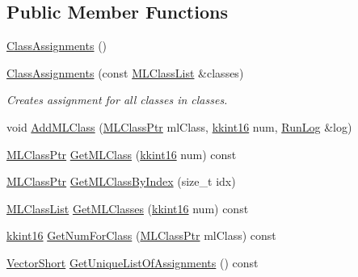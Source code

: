 \subsection*{Public Member Functions}
\begin{DoxyCompactItemize}
\item 
\hyperlink{class_k_k_m_l_l_1_1_class_assignments_a73a506718f34e1b30cc4ce5f4eac7a0e}{Class\+Assignments} ()
\item 
\hyperlink{class_k_k_m_l_l_1_1_class_assignments_a663f8e557f7d2e8f4bb7c79cbb09ac37}{Class\+Assignments} (const \hyperlink{class_k_k_m_l_l_1_1_m_l_class_list}{M\+L\+Class\+List} \&classes)
\begin{DoxyCompactList}\small\item\em Creates assignment for all classes in \textquotesingle{}classes. \end{DoxyCompactList}\item 
void \hyperlink{class_k_k_m_l_l_1_1_class_assignments_acdb4c256d35bd94ee6ddd0fd2f56b939}{Add\+M\+L\+Class} (\hyperlink{namespace_k_k_m_l_l_ac272393853d59e72e8456f14cd6d8c23}{M\+L\+Class\+Ptr} ml\+Class, \hyperlink{namespace_k_k_b_a93809780ee294124dda4c23069f41248}{kkint16} num, \hyperlink{class_k_k_b_1_1_run_log}{Run\+Log} \&log)
\item 
\hyperlink{namespace_k_k_m_l_l_ac272393853d59e72e8456f14cd6d8c23}{M\+L\+Class\+Ptr} \hyperlink{class_k_k_m_l_l_1_1_class_assignments_a1e6deee5eda8bf069953b65f6a0ef187}{Get\+M\+L\+Class} (\hyperlink{namespace_k_k_b_a93809780ee294124dda4c23069f41248}{kkint16} num) const 
\item 
\hyperlink{namespace_k_k_m_l_l_ac272393853d59e72e8456f14cd6d8c23}{M\+L\+Class\+Ptr} \hyperlink{class_k_k_m_l_l_1_1_class_assignments_a241c008a2778230aeb29713eebd6465c}{Get\+M\+L\+Class\+By\+Index} (size\+\_\+t idx)
\item 
\hyperlink{class_k_k_m_l_l_1_1_m_l_class_list}{M\+L\+Class\+List} \hyperlink{class_k_k_m_l_l_1_1_class_assignments_ab22230c4e9de89d4c28123629dd0b46a}{Get\+M\+L\+Classes} (\hyperlink{namespace_k_k_b_a93809780ee294124dda4c23069f41248}{kkint16} num) const 
\item 
\hyperlink{namespace_k_k_b_a93809780ee294124dda4c23069f41248}{kkint16} \hyperlink{class_k_k_m_l_l_1_1_class_assignments_a16bde30c19763d38ebcf9c33f0accd5f}{Get\+Num\+For\+Class} (\hyperlink{namespace_k_k_m_l_l_ac272393853d59e72e8456f14cd6d8c23}{M\+L\+Class\+Ptr} ml\+Class) const 
\item 
\hyperlink{namespace_k_k_b_a17d2c938216be2f3e37e982067fa7234}{Vector\+Short} \hyperlink{class_k_k_m_l_l_1_1_class_assignments_a6cdebfb9d64aa472db2151113fcea92c}{Get\+Unique\+List\+Of\+Assignments} () const 

\end{DoxyCompactItemize}
